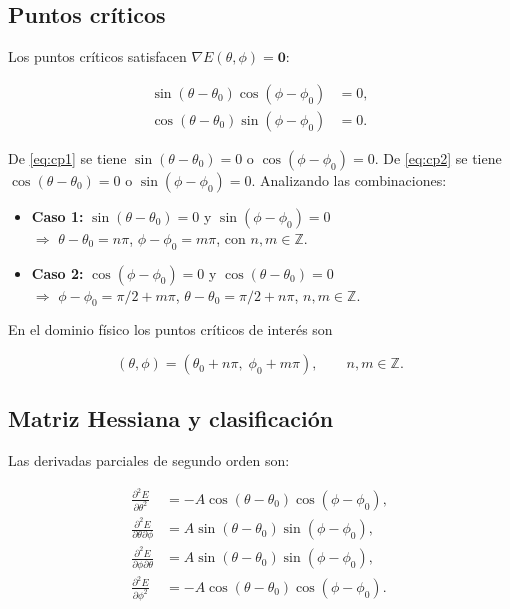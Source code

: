 \documentclass[12pt,a4paper]{article}
\begin{document}
\subsection{Puntos críticos}

Los puntos críticos satisfacen $\nabla E(\theta,\phi)=\mathbf{0}$:

\begin{align}
\sin(\theta-\theta_0)\cos(\phi-\phi_0) &= 0, \label{eq:cp1}\\
\cos(\theta-\theta_0)\sin(\phi-\phi_0) &= 0. \label{eq:cp2}
\end{align}

De \eqref{eq:cp1} se tiene $\sin(\theta-\theta_0)=0$ o $\cos(\phi-\phi_0)=0$.
De \eqref{eq:cp2} se tiene $\cos(\theta-\theta_0)=0$ o $\sin(\phi-\phi_0)=0$.
Analizando las combinaciones:

\begin{itemize}
    \item \textbf{Caso 1:} $\sin(\theta-\theta_0)=0$ y $\sin(\phi-\phi_0)=0$ \\
    $\Rightarrow$ $\theta-\theta_0=n\pi$, $\phi-\phi_0=m\pi$, con $n,m\in\mathbb{Z}$.

    \item \textbf{Caso 2:} $\cos(\phi-\phi_0)=0$ y $\cos(\theta-\theta_0)=0$ \\
    $\Rightarrow$ $\phi-\phi_0=\pi/2+m\pi$, $\theta-\theta_0=\pi/2+n\pi$, $n,m\in\mathbb{Z}$.
\end{itemize}

En el dominio físico los puntos críticos de interés son

\begin{equation}\label{eq:cp_final}
(\theta,\phi)=(\theta_0+n\pi,\;\phi_0+m\pi),\qquad n,m\in\mathbb{Z}.
\end{equation}

\subsection{Matriz Hessiana y clasificación}

Las derivadas parciales de segundo orden son:

\begin{align}
\frac{\partial^2 E}{\partial\theta^2}
&= -A\cos(\theta-\theta_0)\cos(\phi-\phi_0), \\[4pt]
\frac{\partial^2 E}{\partial\theta\partial\phi}
&= A\sin(\theta-\theta_0)\sin(\phi-\phi_0), \\[4pt]
\frac{\partial^2 E}{\partial\phi\partial\theta}
&= A\sin(\theta-\theta_0)\sin(\phi-\phi_0), \\[4pt]
\frac{\partial^2 E}{\partial\phi^2}
&= -A\cos(\theta-\theta_0)\cos(\phi-\phi_0).
\end{align}
\end{document}
